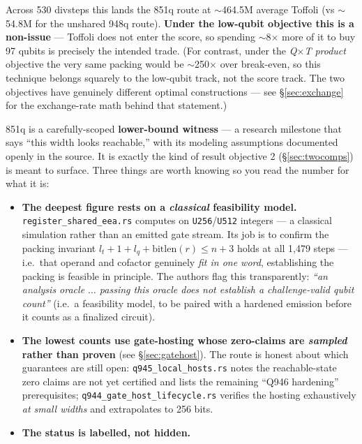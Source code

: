 \documentclass[11pt,a4paper]{article}
\begin{document}
Across 530 divsteps this lands the 851q route at $\sim$464.5M average Toffoli (vs $\sim$54.8M for
the unshared 948q route). \textbf{Under the low-qubit objective this is a non-issue} --- Toffoli does
not enter the score, so spending $\sim$8$\times$ more of it to buy 97 qubits is precisely the
intended trade. (For contrast, under the \emph{Q$\times$T product} objective the very same packing
would be $\sim$250$\times$ over break-even, so this technique belongs squarely to the low-qubit
track, not the score track. The two objectives have genuinely different optimal constructions --- see
\S\ref{sec:exchange} for the exchange-rate math behind that statement.)

\begin{tcolorbox}[noteboxstyle, title={How to read the 851q figure}]
851q is a carefully-scoped \textbf{lower-bound witness} --- a research milestone that says ``this
width looks reachable,'' with its modeling assumptions documented openly in the source. It is exactly
the kind of result objective 2 (\S\ref{sec:twocomps}) is meant to surface. Three things are worth
knowing so you read the number for what it is:
\begin{itemize}
  \item \textbf{The deepest figure rests on a \emph{classical} feasibility model.}
    \lstinline{register_shared_eea.rs} computes on \texttt{U256}/\texttt{U512} integers --- a
    classical simulation rather than an emitted gate stream. Its job is to confirm the packing
    invariant $l_t + 1 + l_q + \mathrm{bitlen}(r) \le n+3$ holds at all 1{,}479 steps --- i.e.\ that
    operand and cofactor genuinely \emph{fit in one word}, establishing the packing is feasible in
    principle. The authors flag this transparently: \emph{``an analysis oracle $\ldots$ passing this
    oracle does not establish a challenge-valid qubit count''} (i.e.\ a feasibility model, to be
    paired with a hardened emission before it counts as a finalized circuit).
  \item \textbf{The lowest counts use gate-hosting whose zero-claims are \emph{sampled} rather than
    proven} (see \S\ref{sec:gatehost}). The route is honest about which guarantees are still open:
    \lstinline{q945_local_hosts.rs} notes the reachable-state zero claims are not yet certified and
    lists the remaining ``Q946 hardening'' prerequisites; \lstinline{q944_gate_host_lifecycle.rs}
    verifies the hosting exhaustively \emph{at small widths} and extrapolates to 256 bits.
  \item \textbf{The status is labelled, not hidden.}

\end{itemize}
\end{tcolorbox}
\end{document}
